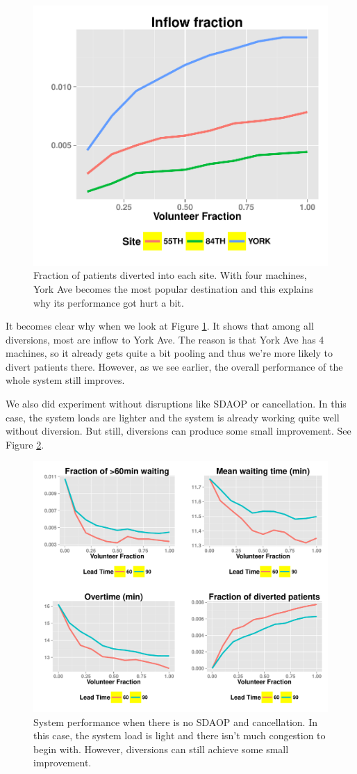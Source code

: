 \begin{figure}[htp]
\centering
\includegraphics[width=.6\textwidth]{chap3/numeric/pic/3sites_site_inflow}
\caption{Fraction of patients diverted into each site. With four machines,
York Ave becomes the most popular destination and this explains why its
performance got hurt a bit.}
\label{fig:3sites_site_inflow}
\end{figure}

It becomes clear why when we look at Figure
\ref{fig:3sites_site_inflow}. It shows that among all diversions, most are inflow to York Ave.
The reason is that York Ave has 4 machines, so it already gets quite a
bit pooling and thus we're more likely to divert patients there.
However, as we see earlier, the overall performance of the whole
system still improves.

We also did experiment without disruptions like SDAOP or cancellation.
In this case, the system loads are lighter and the system is already
working quite well without diversion. But still, diversions can
produce some small improvement. See Figure \ref{fig:3sites_without_sdaop}.

\begin{figure}[htp]
\centering
\includegraphics[width=.9\textwidth]{chap3/numeric/pic/3sites_without_sdaop}
\caption{System performance when there is no SDAOP and cancellation.
In this case, the system load is light and there isn't much congestion
to begin with. However, diversions can still achieve some small improvement.}
\label{fig:3sites_without_sdaop}
\end{figure}
